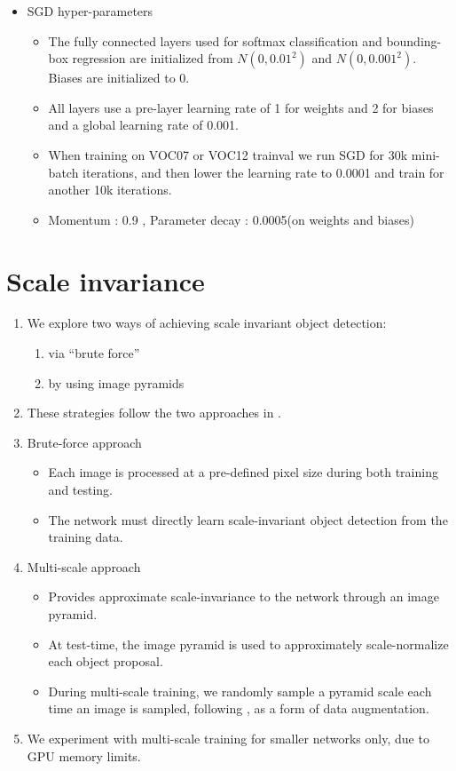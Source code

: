 \documentclass[11pt]{book}
\begin{document}
\begin{itemize}
\item SGD hyper-parameters\\
\label{sec-1-1-3-4}%
\begin{itemize}
\item The fully connected layers used for softmax classification and bounding-box regression
       are initialized from $N(0,0.01^2)$ and $N(0,0.001^2)$. Biases are initialized to 0.
\item All layers use a pre-layer learning rate of 1 for weights and 2 for biases and a global
       learning rate of 0.001.
\item When training on VOC07 or VOC12 trainval we run SGD for 30k mini-batch iterations, and
       then lower the learning rate to 0.0001 and train for another 10k iterations.
\item Momentum : 0.9 , Parameter decay : 0.0005(on weights and biases)
\end{itemize}

\end{itemize} %
\section{Scale invariance}
\label{sec-1-1-4}


\begin{enumerate}
\item We explore two ways of achieving scale invariant object detection:
\begin{enumerate}
\item via ``brute force''
\item by using image pyramids
\end{enumerate}
\item These strategies follow the two approaches in \footnotemark[4].
\item Brute-force approach
\begin{itemize}
\item Each image is processed at a pre-defined pixel size during both training and testing.
\item The network must directly learn scale-invariant object detection from the training data.
\end{itemize}
\item Multi-scale approach
\begin{itemize}
\item Provides approximate scale-invariance to the network through an image pyramid.
\item At test-time, the image pyramid is used to approximately scale-normalize each object 
         proposal.
\item During multi-scale training, we randomly sample a pyramid scale each time an image is
         sampled, following \footnotemark[4], as a form of data augmentation.
\end{itemize}
\item We experiment with multi-scale training for smaller networks only, due to GPU memory limits.
\end{enumerate}
          
\end{document}
